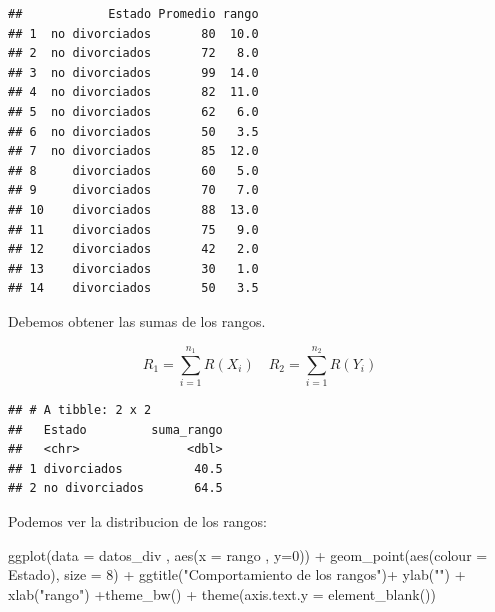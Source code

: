 \documentclass[
]{article}
\newenvironment{Shaded}{\begin{snugshade}}{\end{snugshade}}
\newcommand{\AttributeTok}[1]{\textcolor[rgb]{0.77,0.63,0.00}{#1}}
\newcommand{\DecValTok}[1]{\textcolor[rgb]{0.00,0.00,0.81}{#1}}
\newcommand{\FunctionTok}[1]{\textcolor[rgb]{0.00,0.00,0.00}{#1}}
\newcommand{\NormalTok}[1]{#1}
\newcommand{\OtherTok}[1]{\textcolor[rgb]{0.56,0.35,0.01}{#1}}
\newcommand{\SpecialCharTok}[1]{\textcolor[rgb]{0.00,0.00,0.00}{#1}}
\newcommand{\StringTok}[1]{\textcolor[rgb]{0.31,0.60,0.02}{#1}}
\begin{document}
\begin{verbatim}
##            Estado Promedio rango
## 1  no divorciados       80  10.0
## 2  no divorciados       72   8.0
## 3  no divorciados       99  14.0
## 4  no divorciados       82  11.0
## 5  no divorciados       62   6.0
## 6  no divorciados       50   3.5
## 7  no divorciados       85  12.0
## 8     divorciados       60   5.0
## 9     divorciados       70   7.0
## 10    divorciados       88  13.0
## 11    divorciados       75   9.0
## 12    divorciados       42   2.0
## 13    divorciados       30   1.0
## 14    divorciados       50   3.5
\end{verbatim}

Debemos obtener las sumas de los rangos.

\[R_{1}=\sum _{i=1}^{n_{1}} R(X_{i}) \quad   R_{2}=\sum _{i=1}^{n_{2}} R(Y_{i}) \]

\begin{Shaded}
\end{Shaded}

\begin{verbatim}
## # A tibble: 2 x 2
##   Estado         suma_rango
##   <chr>               <dbl>
## 1 divorciados          40.5
## 2 no divorciados       64.5
\end{verbatim}

Podemos ver la distribucion de los rangos:

\begin{Shaded}
\begin{Highlighting}[]
\FunctionTok{ggplot}\NormalTok{(}\AttributeTok{data =}\NormalTok{ datos\_div , }\FunctionTok{aes}\NormalTok{(}\AttributeTok{x =}\NormalTok{ rango , }\AttributeTok{y=}\DecValTok{0}\NormalTok{)) }\SpecialCharTok{+} 
  \FunctionTok{geom\_point}\NormalTok{(}\FunctionTok{aes}\NormalTok{(}\AttributeTok{colour =}\NormalTok{ Estado), }\AttributeTok{size =} \DecValTok{8}\NormalTok{) }\SpecialCharTok{+} 
  \FunctionTok{ggtitle}\NormalTok{(}\StringTok{"Comportamiento de los rangos"}\NormalTok{)}\SpecialCharTok{+} \FunctionTok{ylab}\NormalTok{(}\StringTok{""}\NormalTok{) }\SpecialCharTok{+} 
  \FunctionTok{xlab}\NormalTok{(}\StringTok{"rango"}\NormalTok{) }\SpecialCharTok{+}\FunctionTok{theme\_bw}\NormalTok{() }\SpecialCharTok{+} \FunctionTok{theme}\NormalTok{(}\AttributeTok{axis.text.y =} \FunctionTok{element\_blank}\NormalTok{())}
\end{Highlighting}
\end{Shaded}
\end{document}
